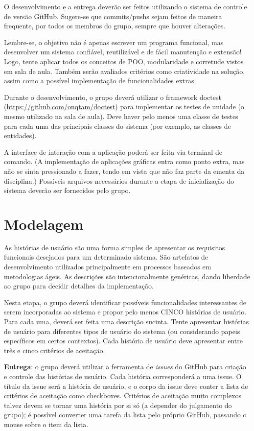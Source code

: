 \documentclass[11pt]{article}
\begin{document}
O desenvolvimento e a entrega deverão ser feitos utilizando o sistema
de controle de versão GitHub. Sugere-se que commits/pushs sejam feitos
de maneira frequente, por todos os membros do grupo, sempre que houver
alterações.

Lembre-se, o objetivo não é apenas escrever um programa funcional, mas
desenvolver um sistema confiável, reutilizável e de fácil manutenção e
extensão! Logo, tente aplicar todos os conceitos de POO, modularidade
e corretude vistos em sala de aula. Também serão avaliados critérios
como criatividade na solução, assim como a possível implementação de
funcionalidades extras

Durante o desenvolvimento, o grupo deverá utilizar o framework doctest
(\url{https://github.com/onqtam/doctest}) para implementar os testes de
unidade (o mesmo utilizado na sala de aula). Deve haver pelo menos uma
classe de testes para cada uma das principais classes do sistema (por
exemplo, as classes de entidades).

A interface de interação com a aplicação poderá ser feita via terminal
de comando. (A implementação de aplicações gráficas entra como ponto
extra, mas não se sinta pressionado a fazer, tendo em vista que não
faz parte da ementa da disciplina.) Possíveis arquivos necessários
durante a etapa de inicialização do sistema deverão ser fornecidos
pelo grupo.
\section{Modelagem}
\label{sec:orgdcc72df}

As histórias de usuário são uma forma simples de apresentar os requisitos
funcionais desejados para um determinado sistema. São artefatos de
desenvolvimento utilizados principalmente em processos baseados em
metodologias ágeis. As descrições são intencionalmente genéricas,
dando liberdade ao grupo para decidir detalhes da implementação.

Nesta etapa, o grupo deverá identificar possíveis funcionalidades
interessantes de serem incorporadas ao sistema e propor pelo menos
CINCO histórias de usuário. Para cada uma, deverá ser feita uma
descrição sucinta. Tente apresentar histórias de usuário para
diferentes tipos de usuário do sistema (ou considerando papeis
específicos em certos contextos). Cada história de usuário deve
apresentar entre três e cinco critérios de aceitação.

\textbf{Entrega}: o grupo deverá utilizar a ferramenta de \emph{issues} do GitHub para
criação e controle das histórias de usuário. Cada história
corresponderá a uma issue. O título da issue será a história de
usuário, e o corpo da issue deve conter a lista de critérios de
aceitação como checkboxes. Critérios de aceitação muito complexos
talvez devem se tornar uma história por si só (a depender do
julgamento do grupo); é possível converter uma tarefa da lista pelo
próprio GitHub, passando o mouse sobre o item da lista.
\end{document}

